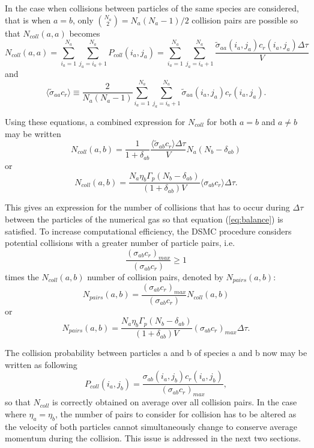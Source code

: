 \documentclass[12pt]{article}
\begin{document}
In the case when collisions between particles of the same species are
considered, that is when $a = b$, only $\binom{N_a}{2} = N_a(N_a-1)/2$
collision pairs are possible so that $N_{coll}(a, a)$ becomes
\begin{equation}
  N_{coll}(a, a) = \sum_{i_a=1}^{N_a}\sum_{j_a=i_a+1}^{N_a} P_{coll}(i_a, j_a) =
  \sum_{i_a=1}^{N_a}\sum_{j_a=i_a+1}^{N_a}\frac{{\tilde\sigma}_{aa}(i_a, j_a)
    c_r(i_a, j_a)\Delta\tau}{V}
\end{equation}
and
\begin{equation}
  \langle{\tilde{\sigma}_{aa} c_r}\rangle \equiv
  \frac{2}{N_a (N_a-1)}
  \sum_{i_a=1}^{N_a}\sum_{j_a=i_a+1}^{N_a} {\tilde\sigma}_{aa}(i_a, j_a)
  c_r(i_a, j_a).
\end{equation}

Using these equations, a combined expression for $N_{coll}$ for both
$a=b$ and $a\not=b$ may be written
\begin{equation}
  N_{coll}(a, b) = \frac{1}{1+\delta_{ab}}
  \frac{\langle{\tilde{\sigma}_{ab}c_r}\rangle\Delta\tau}{V} N_a(N_b - \delta_{ab})
\end{equation}
or
\begin{equation}
  N_{coll}(a, b) = \frac{N_a \eta_b\Gamma_p(N_b - \delta_{ab})}{(1+\delta_{ab})V}
  \langle\sigma_{ab}c_r\rangle\Delta\tau.
\end{equation}

This gives an expression for the number of collisions that has to
occur during $\Delta\tau$ between the particles of the numerical gas
so that equation (\ref{eq:balance}) is satisfied. To increase
computational efficiency, the DSMC procedure considers potential
collisions with a greater number of particle pairs, i.e.
\[
\frac{(\sigma_{ab}c_r)_{max}}{(\sigma_{ab}c_r)} \ge 1
\]
times the $N_{coll}(a, b)$ number of collision pairs, denoted by
$N_{pairs}(a, b)$:
\begin{equation}
  N_{pairs}(a, b) = \frac{(\sigma_{ab}c_r)_{max}}{(\sigma_{ab}c_r)} N_{coll}(a, b)
\end{equation}
or
\begin{equation}
  N_{pairs}(a, b) = \frac{N_a \eta_b\Gamma_p(N_b - \delta_{ab})}{(1+\delta_{ab})V}
  (\sigma_{ab}c_r)_{max}\Delta\tau.
\end{equation}

The collision probability between particles a and b of species a and b
now may be written as following
\begin{equation}
  P_{coll}(i_a, j_b) = \frac{\sigma_{ab}(i_a, j_b) c_r(i_a,
    j_b)}{(\sigma_{ab}c_r)_{max}},
\end{equation}
so that $N_{coll}$ is correctly obtained on average over all collision
pairs. In the case where $\eta_a = \eta_b$, the number of pairs to consider
for collision has to be altered as the velocity of both particles
cannot simultaneously change to conserve average momentum during the
collision. This issue is addressed in the next two sections.
\end{document}
